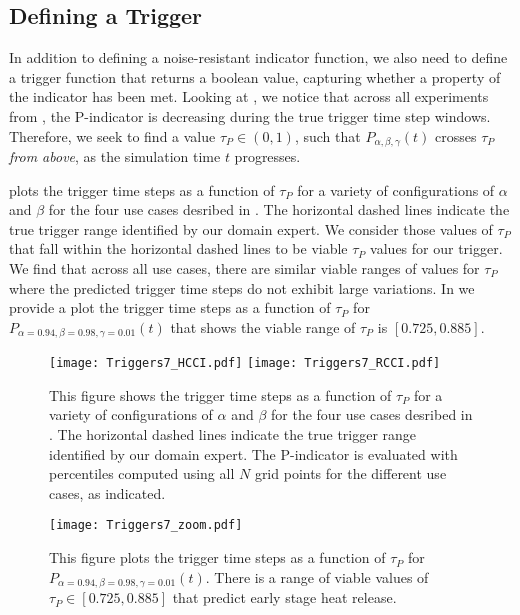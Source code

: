 \documentclass[final]{siamltex}
\newcommand{\pmetric}{P}
\newcommand{\thresh}{\tau}
\begin{document}
\subsection{Defining a Trigger}
\label{sec:trigger} 

In addition to defining a noise-resistant indicator function, we also need to define a trigger
function that returns a boolean value, capturing whether a property of the
indicator has been met. Looking at , we notice that across all
experiments from , the \pmetric-indicator is decreasing during the true trigger time
step windows.  Therefore, we seek to find a value 
$\thresh_{\pmetric} \in (0,1)$, such that $\pmetric_{\alpha,\beta,\gamma}(t)$ crosses $\thresh_{\pmetric}$ \emph{from
above}, as the simulation time $t$ progresses. 

 plots the trigger time steps as a function of
$\thresh_{\pmetric}$ for a variety of configurations of $\alpha$ and $\beta$
for the four use cases desribed in .  
The horizontal dashed lines indicate the true trigger range identified by our
domain expert.  We consider those values of $\thresh_{\pmetric}$ that fall within the
horizontal dashed lines to be viable $\thresh_{\pmetric}$ values for our trigger.  We find that across all
use cases, there are similar viable ranges of values for $\thresh_{\pmetric}$
where the predicted trigger time steps do not exhibit large variations. In
 we provide a plot the trigger time steps as a function of
$\thresh_{\pmetric}$ for $\pmetric_{\alpha=0.94, \beta=0.98,\gamma=0.01}(t)$
that shows the viable range of $\thresh_{\pmetric}$ is $[ 0.725, 0.885 ]$.

\begin{figure}[htpb]
\centering
\texttt{[image: Triggers7\_HCCI.pdf]}
\texttt{[image: Triggers7\_RCCI.pdf]}
\caption{\label{fig:Thresholds} 
This figure shows the trigger time steps as a function of
$\thresh_{\pmetric}$ for a variety of configurations of $\alpha$ and $\beta$
for the four use cases desribed in .  
The horizontal dashed lines indicate the true trigger range identified by our
domain expert.  The \pmetric-indicator is evaluated with percentiles computed
using all $N$ grid points for the different use cases, as indicated. } 
\end{figure}

\begin{figure}[t]
\centering
\texttt{[image: Triggers7\_zoom.pdf]}
\caption{\label{fig:Triggers_thresh} This figure plots the trigger time steps as a function of
$\thresh_{\pmetric}$ for $\pmetric_{\alpha=0.94, \beta=0.98,\gamma=0.01}(t)$.
  There is a range of viable values of $\thresh_{\pmetric} \in [0.725, 0.885]$ that
  predict early stage heat release.
}
\end{figure}
 
\end{document}
